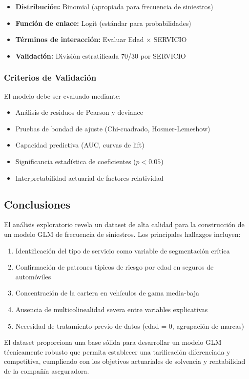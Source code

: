 \begin{itemize}
\item \textbf{Distribución:} Binomial (apropiada para frecuencia de siniestros)
\item \textbf{Función de enlace:} Logit (estándar para probabilidades)
\item \textbf{Términos de interacción:} Evaluar Edad $\times$ SERVICIO
\item \textbf{Validación:} División estratificada 70/30 por SERVICIO
\end{itemize}

\subsubsection{Criterios de Validación}

El modelo debe ser evaluado mediante:
\begin{itemize}
\item Análisis de residuos de Pearson y deviance
\item Pruebas de bondad de ajuste (Chi-cuadrado, Hosmer-Lemeshow)
\item Capacidad predictiva (AUC, curvas de lift)
\item Significancia estadística de coeficientes ($p < 0.05$)
\item Interpretabilidad actuarial de factores relatividad
\end{itemize}

\subsection{Conclusiones}

El análisis exploratorio revela un dataset de alta calidad para la construcción de un modelo GLM de frecuencia de siniestros. Los principales hallazgos incluyen:

\begin{enumerate}
\item Identificación del tipo de servicio como variable de segmentación crítica
\item Confirmación de patrones típicos de riesgo por edad en seguros de automóviles
\item Concentración de la cartera en vehículos de gama media-baja
\item Ausencia de multicolinealidad severa entre variables explicativas
\item Necesidad de tratamiento previo de datos (edad = 0, agrupación de marcas)
\end{enumerate}

El dataset proporciona una base sólida para desarrollar un modelo GLM técnicamente robusto que permita establecer una tarificación diferenciada y competitiva, cumpliendo con los objetivos actuariales de solvencia y rentabilidad de la compañía aseguradora.
